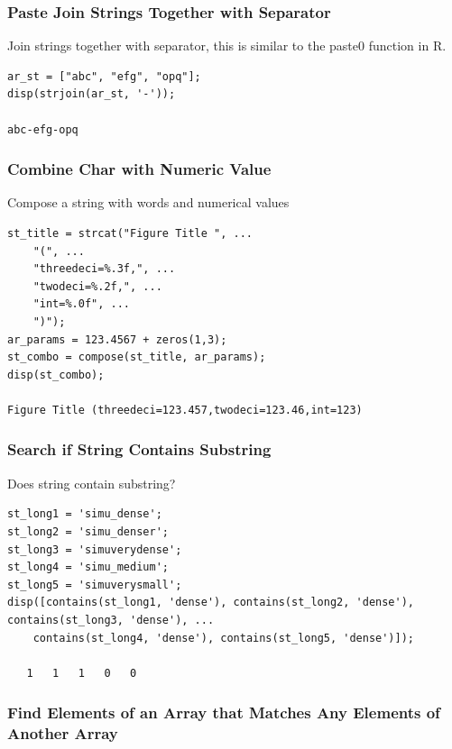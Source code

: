 \documentclass[
]{book}
\begin{document}
\hypertarget{paste-join-strings-together-with-separator}{%
\subsubsection{Paste Join Strings Together with Separator}\label{paste-join-strings-together-with-separator}}

Join strings together with separator, this is similar to the paste0
function in R.

\begin{verbatim}
ar_st = ["abc", "efg", "opq"];
disp(strjoin(ar_st, '-'));

abc-efg-opq
\end{verbatim}

\hypertarget{combine-char-with-numeric-value}{%
\subsubsection{Combine Char with Numeric Value}\label{combine-char-with-numeric-value}}

Compose a string with words and numerical values

\begin{verbatim}
st_title = strcat("Figure Title ", ...
    "(", ...
    "threedeci=%.3f,", ...
    "twodeci=%.2f,", ...
    "int=%.0f", ...
    ")");
ar_params = 123.4567 + zeros(1,3);
st_combo = compose(st_title, ar_params);
disp(st_combo);

Figure Title (threedeci=123.457,twodeci=123.46,int=123)
\end{verbatim}

\hypertarget{search-if-string-contains-substring}{%
\subsubsection{Search if String Contains Substring}\label{search-if-string-contains-substring}}

Does string contain substring?

\begin{verbatim}
st_long1 = 'simu_dense';
st_long2 = 'simu_denser';
st_long3 = 'simuverydense';
st_long4 = 'simu_medium';
st_long5 = 'simuverysmall';
disp([contains(st_long1, 'dense'), contains(st_long2, 'dense'), contains(st_long3, 'dense'), ...
    contains(st_long4, 'dense'), contains(st_long5, 'dense')]);

   1   1   1   0   0
\end{verbatim}

\hypertarget{find-elements-of-an-array-that-matches-any-elements-of-another-array}{%
\subsubsection{Find Elements of an Array that Matches Any Elements of Another Array}\label{find-elements-of-an-array-that-matches-any-elements-of-another-array}}
\end{document}
